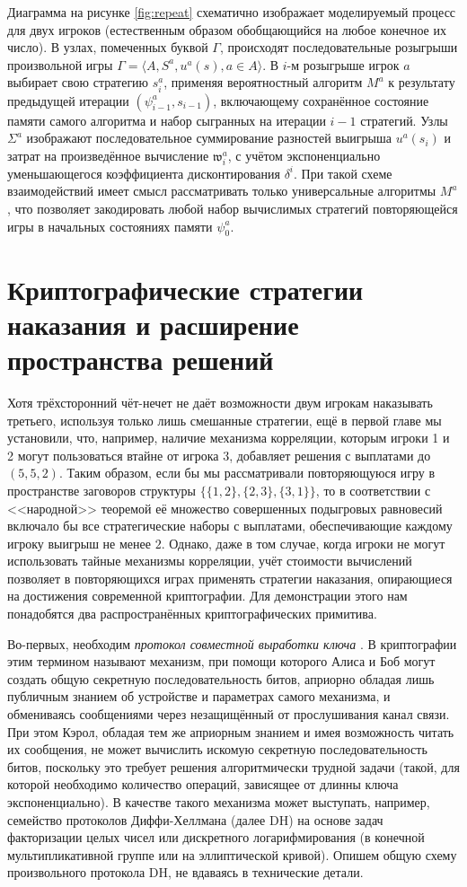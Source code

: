 Диаграмма на рисунке \ref{fig:repeat} схематично изображает моделируемый процесс для двух игроков (естественным образом обобщающийся на любое конечное их число). В узлах, помеченных буквой $\Gamma$, происходят последовательные розыгрыши произвольной игры $\Gamma = \langle A, S^a, u^a(s), a \in A \rangle$. В $i$-м розыгрыше игрок $a$ выбирает свою стратегию $s^a_i$, применяя вероятностный алгоритм $M^a$ к результату предыдущей итерации $(\psi^a_{i-1}, s_{i-1})$, включающему сохранённое состояние памяти самого алгоритма и набор сыгранных на итерации $i-1$ стратегий. Узлы $\Sigma^a$ изображают последовательное суммирование разностей выигрыша $u^a(s_i)$ и затрат на произведённое вычисление $\mathfrak{w}^a_i$, с учётом экспоненциально уменьшающегося коэффициента дисконтирования $\delta^i$. При такой схеме взаимодействий имеет смысл рассматривать только универсальные алгоритмы $M^a$, что позволяет закодировать любой набор вычислимых стратегий повторяющейся игры в начальных состояниях памяти $\psi^a_0$.

\section{Криптографические стратегии наказания и расширение пространства решений}\label{sec:ch3/sect3}

Хотя трёхсторонний чёт-нечет не даёт возможности двум игрокам наказывать третьего, используя только лишь смешанные стратегии, ещё в первой главе мы установили, что, например, наличие механизма корреляции, которым игроки 1 и 2 могут пользоваться втайне от игрока 3, добавляет решения с выплатами до $(5, 5, 2)$. Таким образом, если бы мы рассматривали повторяющуюся игру в пространстве заговоров структуры $\{\{1, 2\}, \{2, 3\}, \{3, 1\}\}$, то в соответствии с <<народной>> теоремой её множество совершенных подыгровых равновесий включало бы все стратегические наборы с выплатами, обеспечивающие каждому игроку выигрыш не менее $2$. Однако, даже в том случае, когда игроки не могут использовать тайные механизмы корреляции, учёт стоимости вычислений позволяет в повторяющихся играх применять стратегии наказания, опирающиеся на достижения современной криптографии. Для демонстрации этого нам понадобятся два распространённых криптографических примитива.

Во-первых, необходим \emph{протокол совместной выработки ключа} \cite{Boyd}. В криптографии этим термином называют механизм, при помощи которого Алиса и Боб могут создать общую секретную последовательность битов, априорно обладая лишь публичным знанием об устройстве и параметрах самого механизма, и обмениваясь сообщениями через незащищённый от прослушивания канал связи. При этом Кэрол, обладая тем же априорным знанием и имея возможность читать их сообщения, не может вычислить искомую секретную последовательность битов, поскольку это требует решения алгоритмически трудной задачи (такой, для которой необходимо количество операций, зависящее от длинны ключа экспоненциально). В качестве такого механизма может выступать, например, семейство протоколов Диффи-Хеллмана (далее DH) на основе задач факторизации целых чисел или дискретного логарифмирования (в конечной мультипликативной группе или на эллиптической кривой). Опишем общую схему произвольного протокола DH, не вдаваясь в технические детали.

